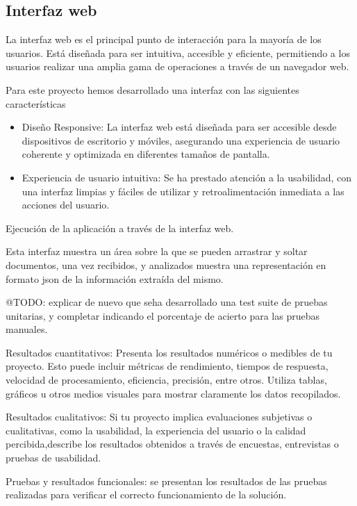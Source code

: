 \subsection*{Interfaz web}
La interfaz web es el principal punto de interacción para la mayoría de los usuarios. Está diseñada para ser intuitiva,
accesible y eficiente, permitiendo a los usuarios realizar una amplia gama de operaciones a través de un navegador web.

Para este proyecto hemos desarrollado una interfaz con las siguientes características

\begin{itemize}
    \item
    Diseño Responsive: La interfaz web está diseñada para ser accesible desde dispositivos de escritorio y móviles,
    asegurando una experiencia de usuario coherente y optimizada en diferentes tamaños de pantalla.
    \item
    Experiencia de usuario intuitiva: Se ha prestado atención a la usabilidad, con una interfaz limpias y fáciles de
    utilizar y retroalimentación inmediata a las acciones del usuario.
\end{itemize}


Ejecución de la aplicación a través de la interfaz web.

Esta interfaz muestra un área sobre la que se pueden arrastrar y soltar documentos, una vez recibidos, y analizados
muestra una representación en formato json de la información extraída del mismo.

\colorbox{color_highlight} {@TODO: }
explicar de nuevo que seha desarrollado una test suite de pruebas unitarias, y
completar indicando el porcentaje de acierto para las pruebas manuales.

Resultados cuantitativos: Presenta los resultados numéricos o medibles de tu
proyecto.
Esto puede incluir métricas de rendimiento, tiempos de respuesta, velocidad de procesamiento, eficiencia,
precisión, entre otros.
Utiliza tablas, gráficos u otros medios visuales para mostrar claramente los datos recopilados.

Resultados cualitativos: Si tu proyecto implica evaluaciones subjetivas o cualitativas, como la usabilidad, la
experiencia del usuario o la calidad percibida,describe los resultados obtenidos a través de encuestas, entrevistas o
pruebas de usabilidad.

Pruebas y resultados funcionales: se presentan los resultados de las pruebas realizadas para verificar el correcto
funcionamiento de la solución.

